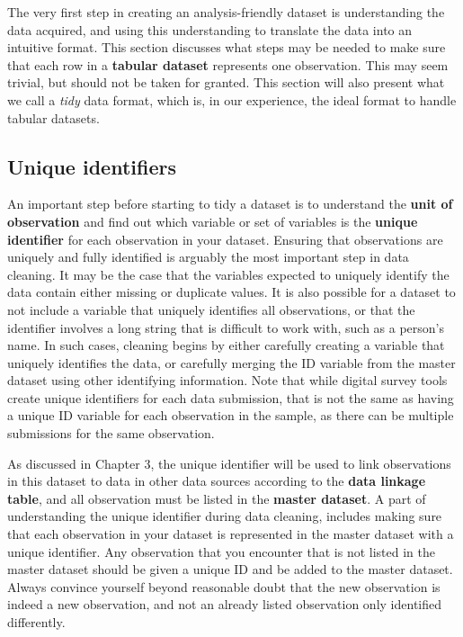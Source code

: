 The very first step in creating an analysis-friendly dataset
is understanding the data acquired,
and using this understanding to translate the data into an intuitive format.
This section discusses what steps may be needed to make sure that each row
in a \textbf{tabular dataset} 
represents one observation.
This may seem trivial, but should not be taken for granted.
This section will also present what we call a \textit{tidy} data format,
which is, in our experience, the ideal format to handle tabular datasets.


\subsection{Unique identifiers}
An important step before starting to tidy a dataset is
to understand the \textbf{unit of observation}
and find out which variable or set of variables is the \textbf{unique identifier} for each observation in your dataset.
Ensuring that observations are uniquely and fully identified
is arguably the most important step in data cleaning.
It may be the case that the variables expected to uniquely identify 
the data contain either missing or duplicate values.
It is also possible for a dataset to not include a variable that uniquely identifies all observations, 
or that the identifier involves a long string that is difficult to work with, such as a person's name.
In such cases, cleaning begins by either carefully creating a variable that uniquely identifies the data,
or carefully merging the ID variable from the master dataset using other identifying information.
Note that while digital survey tools create unique identifiers for each data submission,
that is not the same as having a unique ID variable for each observation in the sample,
as there can be multiple submissions for the same observation.

As discussed in Chapter 3, 
the unique identifier will be used to link observations in this dataset
to data in other data sources according to the \textbf{data linkage table},
and all observation must be listed in the \textbf{master dataset}.
A part of understanding the unique identifier during data cleaning,
includes making sure that each observation in your dataset
is represented in the master dataset with a unique identifier.
Any observation that you encounter that is not listed in the master dataset
should be given a unique ID and be added to the master dataset.
Always convince yourself beyond reasonable doubt that the new observation 
is indeed a new observation, 
and not an already listed observation only identified differently.

